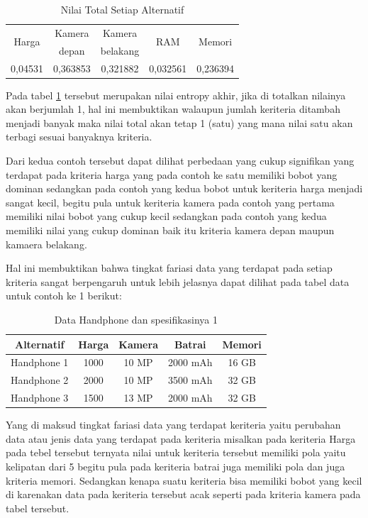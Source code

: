 \begin{table}[h]
\caption{Nilai Total Setiap Alternatif}
\centering
\begin{tabular}{|c|c|c|c|c|}
\hline
\multirow{2}{*}{ Harga}& Kamera & Kamera&\multirow{2}{*}{RAM}& \multirow{2}{*}{Memori}\\
& depan & belakang & &\\
\hline
0,04531&0,363853&0,321882&0,032561&0,236394\\
\hline

\end{tabular}
\label{TA13}
\end{table}

Pada tabel \ref{TA13} tersebut merupakan nilai entropy akhir, jika di totalkan nilainya akan berjumlah 1, hal ini membuktikan walaupun jumlah keriteria ditambah menjadi banyak maka nilai total akan tetap 1 (satu) yang mana nilai satu akan terbagi sesuai banyaknya kriteria. \par

Dari kedua contoh tersebut dapat dilihat perbedaan yang cukup signifikan yang terdapat pada kriteria harga yang pada contoh ke satu memiliki bobot yang dominan sedangkan pada contoh yang kedua bobot untuk keriteria harga menjadi sangat kecil, begitu pula untuk keriteria kamera pada contoh yang pertama memiliki nilai bobot yang cukup kecil sedangkan pada contoh yang kedua memiliki nilai yang cukup dominan baik itu kriteria kamera depan maupun kamaera belakang.\par

Hal ini membuktikan bahwa tingkat fariasi data yang terdapat pada setiap kriteria sangat berpengaruh untuk lebih jelasnya dapat dilihat pada tabel data untuk contoh ke 1 berikut:

\begin{table}[h]
\caption{Data Handphone dan spesifikasinya 1}
\centering
\begin{tabular}{|c|c|c|c|c|}
\hline
Alternatif & Harga & Kamera & Batrai&Memori\\
\hline
Handphone 1 &1000 & 10 MP & 2000 mAh &  16 GB\\
\hline
Handphone 2 &2000 & 10 MP & 3500 mAh &  32 GB\\
\hline
Handphone 3 &1500 & 13 MP & 2000 mAh &  32 GB\\
\hline

\end{tabular}
\label{T3-1}
\end{table}

Yang di maksud tingkat fariasi data yang terdapat keriteria yaitu perubahan data atau jenis data yang terdapat pada keriteria misalkan pada keriteria Harga pada tebel tersebut ternyata nilai untuk keriteria tersebut memiliki pola yaitu kelipatan dari 5 begitu pula pada keriteria batrai juga memiliki pola dan juga kriteria memori. Sedangkan kenapa suatu keriteria bisa memiliki bobot yang kecil di karenakan data pada keriteria tersebut acak seperti pada kriteria kamera pada tabel tersebut. \par

